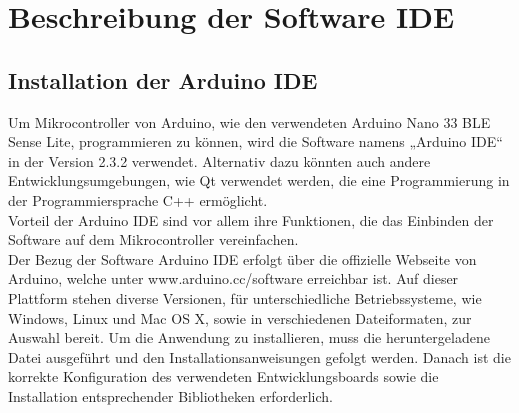 

\chapter{Beschreibung der Software IDE}

\section{Installation der Arduino IDE}
Um Mikrocontroller von Arduino, wie den verwendeten Arduino Nano 33 BLE Sense Lite, programmieren zu können, wird die Software namens „Arduino IDE“ in der Version 2.3.2 verwendet. 
Alternativ dazu könnten auch andere Entwicklungsumgebungen, wie Qt verwendet werden, die eine Programmierung in der Programmiersprache C++ ermöglicht. \\
Vorteil der Arduino IDE sind vor allem ihre Funktionen, die das Einbinden der Software auf dem Mikrocontroller vereinfachen.\\
Der Bezug der Software Arduino IDE erfolgt über die offizielle Webseite von Arduino, welche unter www.arduino.cc/software erreichbar ist. Auf dieser Plattform stehen diverse Versionen, für unterschiedliche Betriebssysteme, wie Windows, Linux und Mac OS X, sowie in verschiedenen Dateiformaten, zur Auswahl bereit. Um die Anwendung zu installieren, muss die heruntergeladene Datei ausgeführt und den Installationsanweisungen gefolgt werden. Danach ist die korrekte Konfiguration des verwendeten Entwicklungsboards sowie die Installation entsprechender Bibliotheken erforderlich.\\

